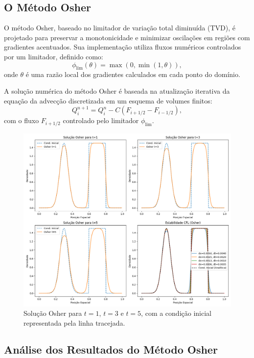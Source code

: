 \subsection{O Método Osher}

O método Osher, baseado no limitador de variação total diminuída (TVD), é projetado para preservar a monotonicidade e minimizar oscilações em regiões com gradientes acentuados. Sua implementação utiliza fluxos numéricos controlados por um limitador, definido como:
\[
    \phi_{\text{lim}}(\theta) = \max(0, \min(1, \theta)),
\]
onde \(\theta\) é uma razão local dos gradientes calculados em cada ponto do domínio.

A solução numérica do método Osher é baseada na atualização iterativa da equação da advecção discretizada em um esquema de volumes finitos:
\[
    Q_i^{n+1} = Q_i^n - C (F_{i+1/2} - F_{i-1/2}),
\]
com o fluxo \(F_{i+1/2}\) controlado pelo limitador \(\phi_{\text{lim}}\).

\begin{figure}[H]
    \centering
    \includegraphics[width=\textwidth]{code/images/Osher.png}
    \caption{Solução Osher para $t=1$, $t=3$ e $t=5$, com a condição inicial representada pela linha tracejada.}
    \label{fig:osher}
\end{figure}

\subsection{Análise dos Resultados do Método Osher}

